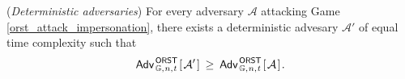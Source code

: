 \documentclass{iacrtrans}
\begin{document}
\begin{rem}\label{rem_deterministic_adversaries}
(\textit{Deterministic adversaries})
\noindent
For every adversary $\mathcal{A}$
attacking Game \ref{orst_attack_impersonation},
there exists a deterministic advesary $\mathcal{A}'$
of equal time complexity such that
\vspace{5pt}
\begin{equation*}\label{deterministic_bound}
\mathsf{Adv}
	_{\hspace{1pt}\mathbb{G},\hspace{0.5pt} n,\hspace{0.5pt} t}
	^{\hspace{1pt}\mathsf{ORST}}
	\hspace{1pt}
		[\hspace{1pt}
			\mathcal{A}'
		\hspace{1pt}]
	\hspace{2pt}
	\ge
	\hspace{2pt}
	\mathsf{Adv}
	_{\hspace{1pt}\mathbb{G},\hspace{0.5pt} n,\hspace{0.5pt} t}
	^{\hspace{1pt}\mathsf{ORST}}
	\hspace{1pt}
		[\hspace{1pt}
			\mathcal{A}
		\hspace{1pt}]\hspace{1pt}.
\vspace{5pt}
\end{equation*}


\end{rem}
\end{document}
